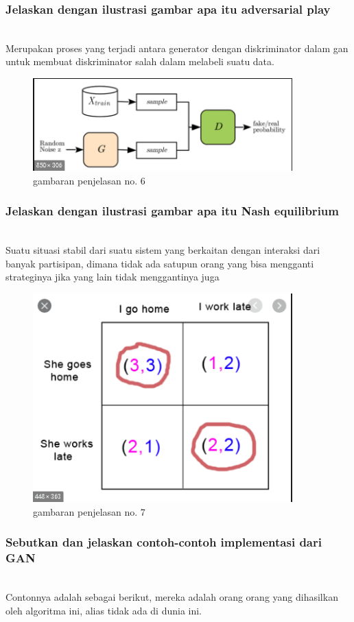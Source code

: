\subsubsection{Jelaskan dengan ilustrasi gambar apa itu adversarial play}
\hfill\\
Merupakan proses yang terjadi antara generator dengan diskriminator dalam gan untuk membuat diskriminator salah dalam melabeli suatu data.
\begin{figure}[H]
	\centering
	\includegraphics[width=10cm]{figures/1174070/8/adversarialplay.png}
	\caption{gambaran penjelasan no. 6}
\end{figure}

\subsubsection{Jelaskan dengan ilustrasi gambar apa itu Nash equilibrium}
\hfill\\
Suatu situasi stabil dari suatu sistem yang berkaitan dengan interaksi dari banyak partisipan, dimana tidak ada satupun orang yang bisa mengganti strateginya jika yang lain tidak menggantinya juga
\begin{figure}[H]
	\centering
	\includegraphics[width=10cm]{figures/1174070/8/nash.png}
	\caption{gambaran penjelasan no. 7}
\end{figure}

\subsubsection{Sebutkan dan jelaskan contoh-contoh implementasi dari GAN}
\hfill\\
Contonnya adalah sebagai berikut, mereka adalah orang orang yang dihasilkan oleh algoritma ini, alias tidak ada di dunia ini.

